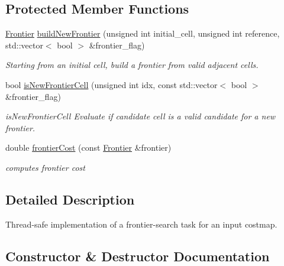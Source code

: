\subsection*{Protected Member Functions}
\begin{DoxyCompactItemize}
\item 
\hyperlink{structfrontier__exploration_1_1Frontier}{Frontier} \hyperlink{classfrontier__exploration_1_1FrontierSearch_a03ab2174fbd43e117cd816aade7d3b38}{build\+New\+Frontier} (unsigned int initial\+\_\+cell, unsigned int reference, std\+::vector$<$ bool $>$ \&frontier\+\_\+flag)
\begin{DoxyCompactList}\small\item\em Starting from an initial cell, build a frontier from valid adjacent cells. \end{DoxyCompactList}\item 
bool \hyperlink{classfrontier__exploration_1_1FrontierSearch_a4fc0a3e7d14dd1bcab5aa67bae684350}{is\+New\+Frontier\+Cell} (unsigned int idx, const std\+::vector$<$ bool $>$ \&frontier\+\_\+flag)
\begin{DoxyCompactList}\small\item\em is\+New\+Frontier\+Cell Evaluate if candidate cell is a valid candidate for a new frontier. \end{DoxyCompactList}\item 
double \hyperlink{classfrontier__exploration_1_1FrontierSearch_a46cf94258988537430a3425140803e59}{frontier\+Cost} (const \hyperlink{structfrontier__exploration_1_1Frontier}{Frontier} \&frontier)
\begin{DoxyCompactList}\small\item\em computes frontier cost \end{DoxyCompactList}\end{DoxyCompactItemize}


\subsection{Detailed Description}
Thread-\/safe implementation of a frontier-\/search task for an input costmap. 

\subsection{Constructor \& Destructor Documentation}
